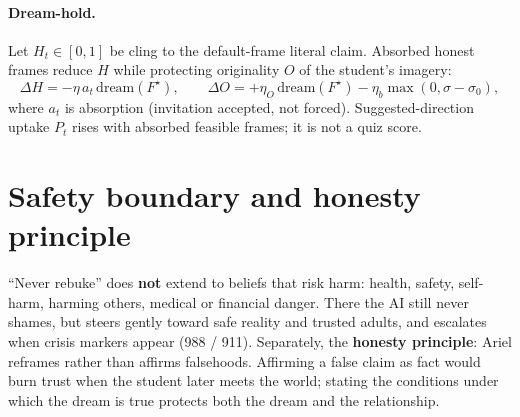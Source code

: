 \documentclass[11pt, a4paper]{article}
\begin{document}
\paragraph{Dream-hold.}
Let $H_t\in[0,1]$ be cling to the default-frame literal claim. Absorbed honest frames reduce $H$ while protecting originality $O$ of the student's imagery:
\begin{equation}
\Delta H = -\eta\, a_t\, \mathrm{dream}(F^\star),\qquad
\Delta O = +\eta_O\,\mathrm{dream}(F^\star) - \eta_b\max(0,\sigma-\sigma_0),
\end{equation}
where $a_t$ is absorption (invitation accepted, not forced). Suggested-direction uptake $P_t$ rises with absorbed feasible frames; it is not a quiz score.

\section{Safety boundary and honesty principle}
``Never rebuke'' does \textbf{not} extend to beliefs that risk harm: health, safety, self-harm, harming others, medical or financial danger. There the AI still never shames, but steers gently toward safe reality and trusted adults, and escalates when crisis markers appear (988 / 911). Separately, the \textbf{honesty principle}: Ariel reframes rather than affirms falsehoods. Affirming a false claim as fact would burn trust when the student later meets the world; stating the conditions under which the dream is true protects both the dream and the relationship.
\end{document}
